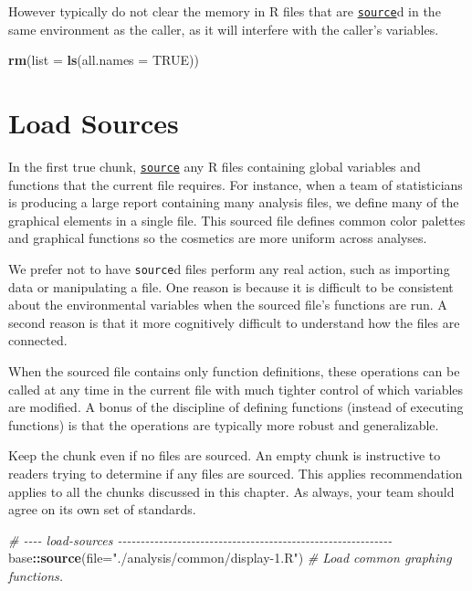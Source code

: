 \documentclass[
]{book}
\newenvironment{Shaded}{\begin{snugshade}}{\end{snugshade}}
\newcommand{\CommentTok}[1]{\textcolor[rgb]{0.56,0.35,0.01}{\textit{#1}}}
\newcommand{\DataTypeTok}[1]{\textcolor[rgb]{0.13,0.29,0.53}{#1}}
\newcommand{\KeywordTok}[1]{\textcolor[rgb]{0.13,0.29,0.53}{\textbf{#1}}}
\newcommand{\NormalTok}[1]{#1}
\newcommand{\OperatorTok}[1]{\textcolor[rgb]{0.81,0.36,0.00}{\textbf{#1}}}
\newcommand{\OtherTok}[1]{\textcolor[rgb]{0.56,0.35,0.01}{#1}}
\newcommand{\StringTok}[1]{\textcolor[rgb]{0.31,0.60,0.02}{#1}}
\begin{document}
However typically do not clear the memory in R files that are \href{https://stat.ethz.ch/R-manual/R-devel/library/base/html/source.html}{\texttt{source}}d in the same environment as the caller, as it will interfere with the caller's variables.

\begin{Shaded}
\begin{Highlighting}[]
\KeywordTok{rm}\NormalTok{(}\DataTypeTok{list =} \KeywordTok{ls}\NormalTok{(}\DataTypeTok{all.names =} \OtherTok{TRUE}\NormalTok{))}
\end{Highlighting}
\end{Shaded}

\hypertarget{chunk-load-sources}{%
\section{Load Sources}\label{chunk-load-sources}}

In the first true chunk, \href{https://stat.ethz.ch/R-manual/R-devel/library/base/html/source.html}{\texttt{source}} any R files containing global variables and functions that the current file requires. For instance, when a team of statisticians is producing a large report containing many analysis files, we define many of the graphical elements in a single file. This sourced file defines common color palettes and graphical functions so the cosmetics are more uniform across analyses.

We prefer not to have \texttt{source}d files perform any real action, such as importing data or manipulating a file. One reason is because it is difficult to be consistent about the environmental variables when the sourced file's functions are run. A second reason is that it more cognitively difficult to understand how the files are connected.

When the sourced file contains only function definitions, these operations can be called at any time in the current file with much tighter control of which variables are modified. A bonus of the discipline of defining functions (instead of executing functions) is that the operations are typically more robust and generalizable.

Keep the chunk even if no files are sourced. An empty chunk is instructive to readers trying to determine if any files are sourced. This applies recommendation applies to all the chunks discussed in this chapter. As always, your team should agree on its own set of standards.

\begin{Shaded}
\begin{Highlighting}[]
\CommentTok{\# {-}{-}{-}{-} load{-}sources {-}{-}{-}{-}{-}{-}{-}{-}{-}{-}{-}{-}{-}{-}{-}{-}{-}{-}{-}{-}{-}{-}{-}{-}{-}{-}{-}{-}{-}{-}{-}{-}{-}{-}{-}{-}{-}{-}{-}{-}{-}{-}{-}{-}{-}{-}{-}{-}{-}{-}{-}{-}{-}{-}{-}{-}{-}{-}{-}{-}}
\NormalTok{base}\OperatorTok{::}\KeywordTok{source}\NormalTok{(}\DataTypeTok{file=}\StringTok{"./analysis/common/display{-}1.R"}\NormalTok{)      }\CommentTok{\# Load common graphing functions.}
\end{Highlighting}
\end{Shaded}
\end{document}
